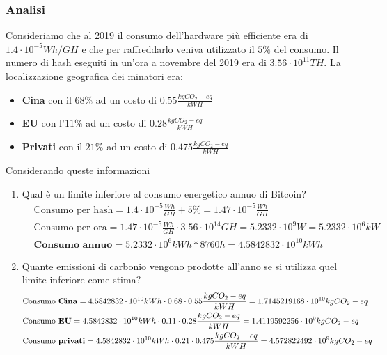 \subsubsection{Analisi}
Consideriamo che al 2019 il consumo dell'hardware più efficiente era di $1.4 \cdot 10^{-5} Wh/GH$ e che per raffreddarlo veniva utilizzato il $5\%$ del consumo. Il numero di hash eseguiti in un'ora a novembre del 2019 era di $3.56 \cdot 10^{11} TH$. La localizzazione geografica dei minatori era:
\begin{itemize}
	\item \textbf{Cina} con il $68\%$ ad un costo di $0.55 \frac{kgCO_2-eq}{kWH}$
	\item \textbf{EU} con l'$11\%$ ad un costo di $0.28 \frac{kgCO_2-eq}{kWH}$
	\item \textbf{Privati} con il $21\%$ ad un costo di $0.475 \frac{kgCO_2-eq}{kWH}$
\end{itemize}
Considerando queste informazioni
\begin{enumerate}
	\item Qual è un limite inferiore al consumo energetico annuo di Bitcoin?
	\begin{equation*}
		\begin{split}
			&\text{Consumo per hash}=1.4 \cdot 10^{-5} \frac{Wh}{GH} + 5\% = 1.47 \cdot 10^{-5} \frac{Wh}{GH} \\
			&\text{Consumo per ora}=1.47 \cdot 10^{-5} \frac{Wh}{GH}  \cdot 3.56 \cdot 10^{14} GH = 5.2332 \cdot 10^9 W = 5.2332 \cdot 10^6 kW \\
			&\textbf{Consumo annuo}=5.2332 \cdot 10^6 kWh * 8760h = 4.5842832 \cdot 10^{10} kWh
		\end{split}
	\end{equation*}
	\item Quante emissioni di carbonio vengono prodotte all'anno se si utilizza quel limite inferiore come stima?
	\begin{equation*}
		\begin{split}
			&\text{Consumo \textbf{Cina}}=4.5842832 \cdot 10^{10} kWh \cdot 0.68 \cdot 0.55 \frac{kgCO_2-eq}{kWH} = 1.7145219168 \cdot 10^{10} kgCO_2-eq\\
			&\text{Consumo \textbf{EU}}=4.5842832 \cdot 10^{10} kWh \cdot 0.11 \cdot 0.28 \frac{kgCO_2-eq}{kWH} = 1.4119592256 \cdot 10^{9} kgCO_2-eq\\
			&\text{Consumo \textbf{privati}}=4.5842832 \cdot 10^{10} kWh \cdot 0.21 \cdot 0.475 \frac{kgCO_2-eq}{kWH} = 4.572822492 \cdot 10^{9} kgCO_2-eq
		\end{split}
	\end{equation*}
\end{enumerate}

